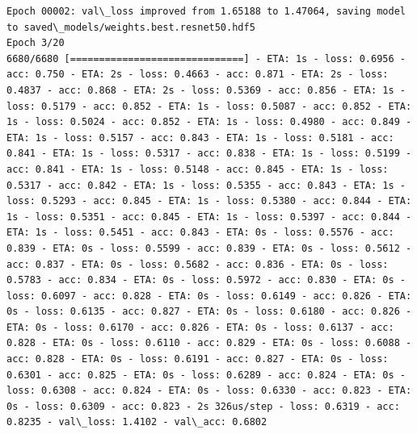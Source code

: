 \documentclass[11pt]{article}
\begin{document}
\begin{Verbatim}[commandchars=\\\{\}]
Epoch 00002: val\_loss improved from 1.65188 to 1.47064, saving model to saved\_models/weights.best.resnet50.hdf5
Epoch 3/20
6680/6680 [==============================] - ETA: 1s - loss: 0.6956 - acc: 0.750 - ETA: 2s - loss: 0.4663 - acc: 0.871 - ETA: 2s - loss: 0.4837 - acc: 0.868 - ETA: 2s - loss: 0.5369 - acc: 0.856 - ETA: 1s - loss: 0.5179 - acc: 0.852 - ETA: 1s - loss: 0.5087 - acc: 0.852 - ETA: 1s - loss: 0.5024 - acc: 0.852 - ETA: 1s - loss: 0.4980 - acc: 0.849 - ETA: 1s - loss: 0.5157 - acc: 0.843 - ETA: 1s - loss: 0.5181 - acc: 0.841 - ETA: 1s - loss: 0.5317 - acc: 0.838 - ETA: 1s - loss: 0.5199 - acc: 0.841 - ETA: 1s - loss: 0.5148 - acc: 0.845 - ETA: 1s - loss: 0.5317 - acc: 0.842 - ETA: 1s - loss: 0.5355 - acc: 0.843 - ETA: 1s - loss: 0.5293 - acc: 0.845 - ETA: 1s - loss: 0.5380 - acc: 0.844 - ETA: 1s - loss: 0.5351 - acc: 0.845 - ETA: 1s - loss: 0.5397 - acc: 0.844 - ETA: 1s - loss: 0.5451 - acc: 0.843 - ETA: 0s - loss: 0.5576 - acc: 0.839 - ETA: 0s - loss: 0.5599 - acc: 0.839 - ETA: 0s - loss: 0.5612 - acc: 0.837 - ETA: 0s - loss: 0.5682 - acc: 0.836 - ETA: 0s - loss: 0.5783 - acc: 0.834 - ETA: 0s - loss: 0.5972 - acc: 0.830 - ETA: 0s - loss: 0.6097 - acc: 0.828 - ETA: 0s - loss: 0.6149 - acc: 0.826 - ETA: 0s - loss: 0.6135 - acc: 0.827 - ETA: 0s - loss: 0.6180 - acc: 0.826 - ETA: 0s - loss: 0.6170 - acc: 0.826 - ETA: 0s - loss: 0.6137 - acc: 0.828 - ETA: 0s - loss: 0.6110 - acc: 0.829 - ETA: 0s - loss: 0.6088 - acc: 0.828 - ETA: 0s - loss: 0.6191 - acc: 0.827 - ETA: 0s - loss: 0.6301 - acc: 0.825 - ETA: 0s - loss: 0.6289 - acc: 0.824 - ETA: 0s - loss: 0.6308 - acc: 0.824 - ETA: 0s - loss: 0.6330 - acc: 0.823 - ETA: 0s - loss: 0.6309 - acc: 0.823 - 2s 326us/step - loss: 0.6319 - acc: 0.8235 - val\_loss: 1.4102 - val\_acc: 0.6802


\end{Verbatim}
\end{document}
